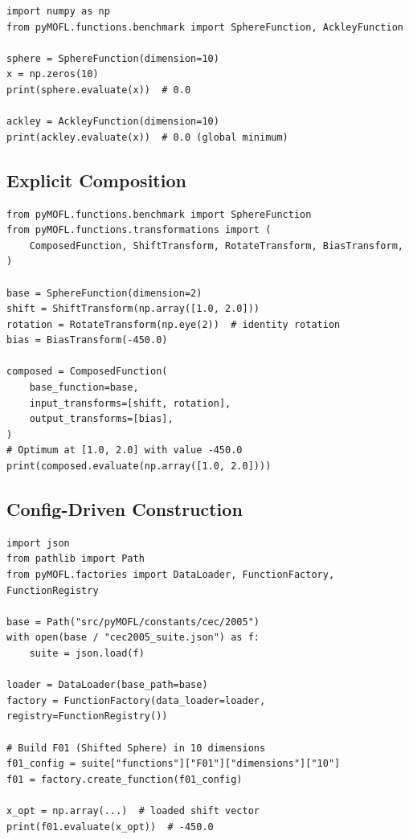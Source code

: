 \documentclass[11pt,a4paper]{article}
\begin{document}
\begin{lstlisting}[caption={Basic function evaluation.}]
import numpy as np
from pyMOFL.functions.benchmark import SphereFunction, AckleyFunction

sphere = SphereFunction(dimension=10)
x = np.zeros(10)
print(sphere.evaluate(x))  # 0.0

ackley = AckleyFunction(dimension=10)
print(ackley.evaluate(x))  # 0.0 (global minimum)
\end{lstlisting}

\subsection{Explicit Composition}

\begin{lstlisting}[caption={Building a transformed function programmatically.}]
from pyMOFL.functions.benchmark import SphereFunction
from pyMOFL.functions.transformations import (
    ComposedFunction, ShiftTransform, RotateTransform, BiasTransform,
)

base = SphereFunction(dimension=2)
shift = ShiftTransform(np.array([1.0, 2.0]))
rotation = RotateTransform(np.eye(2))  # identity rotation
bias = BiasTransform(-450.0)

composed = ComposedFunction(
    base_function=base,
    input_transforms=[shift, rotation],
    output_transforms=[bias],
)
# Optimum at [1.0, 2.0] with value -450.0
print(composed.evaluate(np.array([1.0, 2.0])))
\end{lstlisting}

\subsection{Config-Driven Construction}

\begin{lstlisting}[caption={Building CEC\,2005 F01 from the suite configuration.}]
import json
from pathlib import Path
from pyMOFL.factories import DataLoader, FunctionFactory, FunctionRegistry

base = Path("src/pyMOFL/constants/cec/2005")
with open(base / "cec2005_suite.json") as f:
    suite = json.load(f)

loader = DataLoader(base_path=base)
factory = FunctionFactory(data_loader=loader, registry=FunctionRegistry())

# Build F01 (Shifted Sphere) in 10 dimensions
f01_config = suite["functions"]["F01"]["dimensions"]["10"]
f01 = factory.create_function(f01_config)

x_opt = np.array(...)  # loaded shift vector
print(f01.evaluate(x_opt))  # -450.0
\end{lstlisting}
\end{document}
